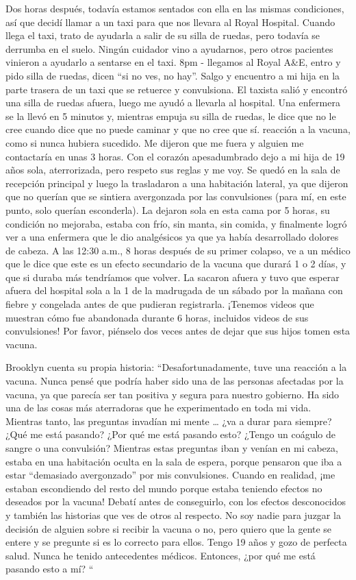 {Dos horas después, todavía estamos sentados con ella en las mismas condiciones,
así que decidí llamar a un taxi para que nos llevara al Royal Hospital. Cuando
llega el taxi, trato de ayudarla a salir de su silla de ruedas, pero todavía se
derrumba en el suelo. Ningún cuidador vino a ayudarnos, pero otros pacientes
vinieron a ayudarlo a sentarse en el taxi. 8pm - llegamos al Royal A\&E, entro y
pido silla de ruedas, dicen “si no ves, no hay”. Salgo y encuentro a mi hija en
la parte trasera de un taxi que se retuerce y convulsiona. El taxista salió y
encontró una silla de ruedas afuera, luego me ayudó a llevarla al hospital. Una
enfermera se la llevó en 5 minutos y, mientras empuja su silla de ruedas, le
dice que no le cree cuando dice que no puede caminar y que no cree que
sí. reacción a la vacuna, como si nunca hubiera sucedido. Me dijeron que me
fuera y alguien me contactaría en unas 3 horas. Con el corazón apesadumbrado
dejo a mi hija de 19 años sola, aterrorizada, pero respeto sus reglas y me
voy. Se quedó en la sala de recepción principal y luego la trasladaron a una
habitación lateral, ya que dijeron que no querían que se sintiera avergonzada
por las convulsiones (para mí, en este punto, solo querían esconderla). La
dejaron sola en esta cama por 5 horas, su condición no mejoraba, estaba con
frío, sin manta, sin comida, y finalmente logró ver a una enfermera que le dio
analgésicos ya que ya había desarrollado dolores de cabeza. A las 12:30 a.m., 8
horas después de su primer colapso, ve a un médico que le dice que este es un
efecto secundario de la vacuna que durará 1 o 2 días, y que si duraba más
tendríamos que volver. La sacaron afuera y tuvo que esperar afuera del hospital
sola a la 1 de la madrugada de un sábado por la mañana con fiebre y congelada
antes de que pudieran registrarla. ¡Tenemos videos que muestran cómo fue
abandonada durante 6 horas, incluidos videos de sus convulsiones! Por favor,
piénselo dos veces antes de dejar que sus hijos tomen esta vacuna.

Brooklyn cuenta su propia historia: “Desafortunadamente, tuve una reacción a la
vacuna. Nunca pensé que podría haber sido una de las personas afectadas por la
vacuna, ya que parecía ser tan positiva y segura para nuestro gobierno. Ha sido
una de las cosas más aterradoras que he experimentado en toda mi vida. Mientras
tanto, las preguntas invadían mi mente … ¿va a durar para siempre? ¿Qué me está
pasando? ¿Por qué me está pasando esto? ¿Tengo un coágulo de sangre o una
convulsión? Mientras estas preguntas iban y venían en mi cabeza, estaba en una
habitación oculta en la sala de espera, porque pensaron que iba a estar
“demasiado avergonzado” por mis convulsiones. Cuando en realidad, ¡me estaban
escondiendo del resto del mundo porque estaba teniendo efectos no deseados por
la vacuna! Debatí antes de conseguirlo, con los efectos desconocidos y también
las historias que ves de otros al respecto. No soy nadie para juzgar la decisión
de alguien sobre si recibir la vacuna o no, pero quiero que la gente se entere y
se pregunte si es lo correcto para ellos. Tengo 19 años y gozo de perfecta
salud. Nunca he tenido antecedentes médicos. Entonces, ¿por qué me está pasando
esto a mí? “

}
